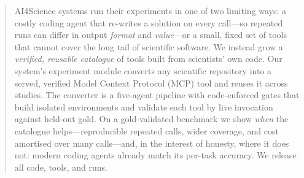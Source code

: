 \begin{abstract}
AI4Science systems run their experiments in one of two limiting ways: a costly
coding agent that re-writes a solution on every call---so repeated runs can
differ in output \emph{format} and \emph{value}---or a small, fixed set of tools
that cannot cover the long tail of scientific software. We instead grow a
\emph{verified, reusable catalogue} of tools built from scientists' own code. Our
system's experiment module converts any scientific repository into a served,
verified Model Context Protocol (MCP) tool and reuses it across studies. The
converter is a five-agent pipeline with code-enforced gates that build isolated
environments and validate each tool by live invocation against held-out gold. On
a gold-validated benchmark we show \emph{when} the catalogue helps---reproducible
repeated calls, wider coverage, and cost amortised over many calls---and, in the
interest of honesty, where it does not: modern coding agents already match its
per-task accuracy. We release all code, tools, and runs.
\end{abstract}
